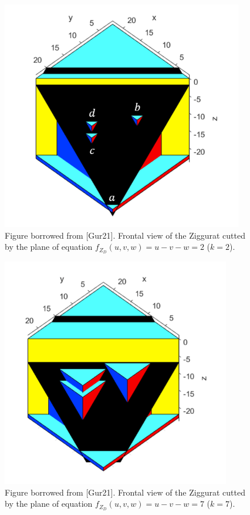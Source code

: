 \documentclass[english, LaM, oneside, noexaminfo]{sapthesis}
\begin{document}
\begin{figure}[tb]
\centering
\includegraphics[height=10cm]{Ziggurat 3D k=2.png}
\caption{Figure borrowed from [Gur21]. Frontal view of the Ziggurat cutted by the plane of equation $f_{Z_D}(u,v,w) = u-v-w = 2$ ($k=2$).}\label{fig:Ziggurat 3D k=2}
\end{figure}

\begin{figure}[tb]
\centering
\includegraphics[height=10cm]{Ziggurat 3D k=7.png}
\caption{Figure borrowed from [Gur21]. Frontal view of the Ziggurat cutted by the plane of equation $f_{Z_D}(u,v,w) = u-v-w = 7$ ($k=7$).}\label{fig:Ziggurat 3D k=7}
\end{figure}
\end{document}
